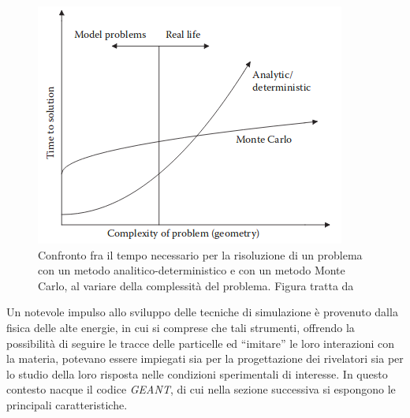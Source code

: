 \begin{figure} [!t]
	\centering
	\includegraphics[scale=0.75]{Grafici/monte_carlo_vs_analytic2.png}
	\caption{Confronto fra il tempo necessario per la risoluzione di un problema con un metodo analitico-deterministico e con un metodo Monte Carlo, al variare della complessità del problema. Figura tratta da~\cite{bielajew:13}} \label{fig:monte_carlo}
\end{figure}




%
%
Un notevole impulso allo sviluppo delle tecniche di simulazione è provenuto dalla fisica delle alte energie, in cui si comprese che tali strumenti, offrendo la possibilità di seguire le tracce delle particelle ed ``imitare'' le loro interazioni con la materia, potevano essere impiegati sia per la progettazione dei rivelatori sia per lo studio della loro risposta nelle condizioni sperimentali di interesse.
In questo contesto nacque il codice \emph{GEANT}, di cui nella sezione successiva si espongono le principali caratteristiche.





